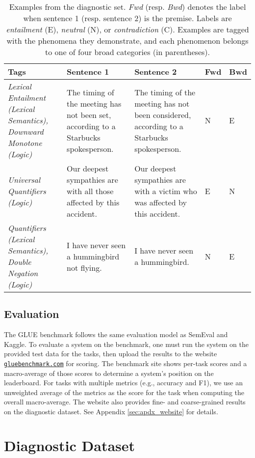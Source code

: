 \begin{table*}[t]
\small
\centering
\begin{tabularx}{\textwidth}{XXXll}
\toprule
 \textbf{Tags} & \textbf{Sentence 1} & \textbf{Sentence 2} & \textbf{Fwd} & \textbf{Bwd} \\
\midrule
\it Lexical Entailment (Lexical Semantics), Downward Monotone (Logic) & The timing of the meeting has not been set, according to a Starbucks spokesperson. & The timing of the meeting has not been considered, according to a Starbucks spokesperson. & N & E \\ \midrule
\it Universal Quantifiers (Logic) & Our deepest sympathies are with all those affected by this accident. & Our deepest sympathies are with a victim who was affected by this accident. & E & N \\ \midrule
\it Quantifiers (Lexical Semantics), Double Negation (Logic) & I have never seen a hummingbird not flying. & I have never seen a hummingbird. & N & E \\
\bottomrule
\end{tabularx}
\caption{Examples from the diagnostic set. \textit{Fwd} (resp. \textit{Bwd}) denotes the label when sentence 1 (resp. sentence 2) is the premise. Labels are \textit{entailment} (E), \textit{neutral} (N), or \textit{contradiction} (C).
Examples are tagged with the phenomena they demonstrate, and each phenomenon belongs to one of four broad categories (in parentheses).
}
\label{tab:analysis-examples}
\end{table*}

\subsection{Evaluation}
The GLUE benchmark follows the same evaluation model as SemEval and Kaggle. To evaluate a system on the benchmark, one must run the system on the provided test data for the tasks, then upload the results to the website \href{https://gluebenchmark.com}{\tt gluebenchmark.com} for scoring. 
The benchmark site shows per-task scores and a macro-average of those scores to determine a system's position on the leaderboard.
For tasks with multiple metrics (e.g., accuracy and F1), we use an unweighted average of the metrics as the score for the task when computing the overall macro-average.
The website also provides fine- and coarse-grained results on the diagnostic dataset. See Appendix \ref{sec:apdx_website} for details.

\section{Diagnostic Dataset}


